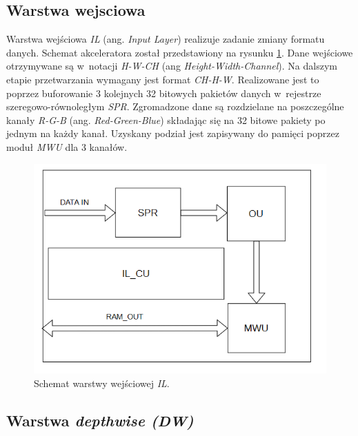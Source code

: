 \subsection{Warstwa wejsciowa}

Warstwa wejściowa \emph{IL} (ang. \emph{Input Layer}) realizuje zadanie zmiany formatu danych.
Schemat akceleratora został przedstawiony na rysunku \ref{fig:il}.
Dane wejściowe otrzymywane są w~notacji \emph{H-W-CH} (ang \emph{Height-Width-Channel}).
Na dalszym etapie przetwarzania wymagany jest format \emph{CH-H-W}.
Realizowane jest to poprzez buforowanie 3 kolejnych 32 bitowych pakietów danych w~rejestrze szeregowo-równoległym \emph{SPR}.
Zgromadzone dane są rozdzielane na poszczególne kanały \emph{R-G-B} (ang. \emph{Red-Green-Blue}) składając się na 32 bitowe pakiety po jednym na każdy kanał.
Uzyskany podział jest zapisywany do pamięci poprzez moduł \emph{MWU} dla 3 kanałów.
\begin{figure}
    \centering
    \includegraphics[width=0.8\linewidth]{images/ILACC.png}
    \caption{Schemat warstwy wejściowej \emph{IL}.}
    \label{fig:il}
\end{figure}

\subsection{Warstwa \emph{depthwise (DW)}}

